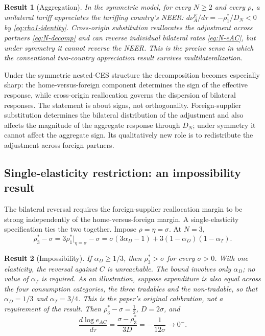 \documentclass[11pt]{article}
\newtheorem{result}{Result}[section]
\begin{document}
\begin{result}[Aggregation]
In the symmetric model, for every $N \geq 2$ and every $\rho$, a unilateral tariff appreciates the tariffing country's NEER: $d\nu_A^E/d\tau = -\rho_1^*/D_N < 0$ by \eqref{eq:rho1-identity}. Cross-origin substitution reallocates the adjustment across partners \eqref{eq:N-decomp} and can reverse individual bilateral rates \eqref{eq:N-eAC}, but under symmetry it cannot reverse the NEER. This is the precise sense in which the conventional two-country appreciation result survives multilateralization.
\end{result}

Under the symmetric nested-CES structure the decomposition becomes especially sharp: the home-versus-foreign component determines the sign of the effective response, while cross-origin reallocation governs the dispersion of bilateral responses. The statement is about signs, not orthogonality. Foreign-supplier substitution determines the bilateral distribution of the adjustment and also affects the magnitude of the aggregate response through $D_N$; under symmetry it cannot affect the aggregate sign. Its qualitatively new role is to redistribute the adjustment across foreign partners.

\subsection{Single-elasticity restriction: an impossibility result}

The bilateral reversal requires the foreign-supplier reallocation margin to be strong independently of the home-versus-foreign margin. A single-elasticity specification ties the two together. Impose $\rho = \eta = \sigma$. At $N = 3$,
\begin{equation}
\rho_3^* - \sigma
= 3\rho_1^*\big|_{\eta=\sigma} - \sigma
= \sigma(3\alpha_D - 1) + 3(1-\alpha_D)(1-\alpha_T) .
\label{eq:3c-gap}
\end{equation}

\begin{result}[Impossibility]
If $\alpha_D \geq 1/3$, then $\rho_3^* > \sigma$ for every $\sigma > 0$. With one elasticity, the reversal against $C$ is unreachable. The bound involves only $\alpha_D$; no value of $\alpha_T$ is required. As an illustration, suppose expenditure is also equal across the four consumption categories, the three tradables and the non-tradable, so that $\alpha_D = 1/3$ and $\alpha_T = 3/4$. This is the paper's original calibration, not a requirement of the result. Then $\rho_3^* - \sigma = \tfrac{1}{2}$, $D = 2\sigma$, and
\begin{equation}
\frac{d\log e_{AC}}{d\tau} = \frac{\sigma - \rho_3^*}{3D} = -\,\frac{1}{12\sigma} \longrightarrow 0^- .
\end{equation}
\end{result}
\end{document}
